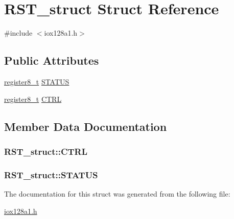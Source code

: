 \hypertarget{struct_r_s_t__struct}{
\section{RST\_\-struct Struct Reference}
\label{struct_r_s_t__struct}
}


{\ttfamily \#include $<$iox128a1.h$>$}

\subsection*{Public Attributes}
\begin{DoxyCompactItemize}
\item 
\hyperlink{iox128a1_8h_a6a0649252b392263406882923b04a9db}{register8\_\-t} \hyperlink{struct_r_s_t__struct_a5a614d43dd1827d7754a762790b41f9f}{STATUS}
\item 
\hyperlink{iox128a1_8h_a6a0649252b392263406882923b04a9db}{register8\_\-t} \hyperlink{struct_r_s_t__struct_ae23e9df159eff5863e9b755804cdb722}{CTRL}
\end{DoxyCompactItemize}


\subsection{Member Data Documentation}
\hypertarget{struct_r_s_t__struct_ae23e9df159eff5863e9b755804cdb722}{
\subsubsection[{CTRL}]{ {\bf RST\_\-struct::CTRL}}}
\label{struct_r_s_t__struct_ae23e9df159eff5863e9b755804cdb722}
\hypertarget{struct_r_s_t__struct_a5a614d43dd1827d7754a762790b41f9f}{
\subsubsection[{STATUS}]{ {\bf RST\_\-struct::STATUS}}}
\label{struct_r_s_t__struct_a5a614d43dd1827d7754a762790b41f9f}


The documentation for this struct was generated from the following file:\begin{DoxyCompactItemize}
\item 
\hyperlink{iox128a1_8h}{iox128a1.h}\end{DoxyCompactItemize}
